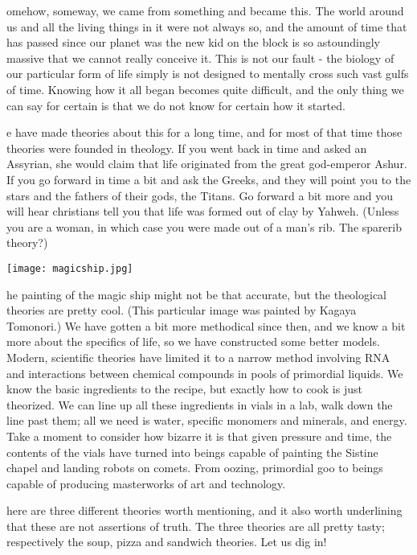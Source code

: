 omehow, someway, we came from something and became this.
The world around us and all the living things in it were not always so, and the amount of time that has passed since our planet was the new kid on the block is so astoundingly massive that we cannot really conceive it.
This is not our fault - the biology of our particular form of life simply is not designed to mentally cross such vast gulfs of time.
Knowing how it all began becomes quite difficult, and the only thing we can say for certain is that we do not know for certain how it started.

e have made theories about this for a long time, and for most of that time those theories were founded in theology.
If you went back in time and asked an Assyrian, she would claim that life originated from the great god-emperor Ashur.
If you go forward in time a bit and ask the Greeks, and they will point you to the stars and the fathers of their gods, the Titans.
Go forward a bit more and you will hear christians tell you that life was formed out of clay by Yahweh.
(Unless you are a woman, in which case you were made out of a man’s rib.
The sparerib theory?) 

\begin{center}
	\texttt{[image: magicship.jpg]}
\end{center}

he painting of the magic ship might not be that accurate, but the theological theories are pretty cool.
(This particular image was painted by Kagaya Tomonori.)
We have gotten a bit more methodical since then, and we know a bit more about the specifics of life, so we have constructed some better models.
Modern, scientific theories have limited it to a narrow method involving RNA and interactions between chemical compounds in pools of primordial liquids.
We know the basic ingredients to the recipe, but exactly how to cook is just theorized.
We can line up all these ingredients in vials in a lab, walk down the line past them; all we need is water, specific monomers and minerals, and energy.
Take a moment to consider how bizarre it is that given pressure and time, the contents of the vials have turned into beings capable of painting the Sistine chapel and landing robots on comets.
From oozing, primordial goo to beings capable of producing masterworks of art and technology.

here are three different theories worth mentioning, and it also worth underlining that these are not assertions of truth.
The three theories are all pretty tasty; respectively the soup, pizza and sandwich theories.
Let us dig in!

